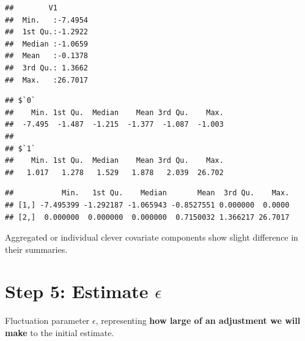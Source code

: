\documentclass[
]{book}
\newenvironment{Shaded}{\begin{snugshade}}{\end{snugshade}}
\newcommand{\DecValTok}[1]{\textcolor[rgb]{0.00,0.00,0.81}{#1}}
\newcommand{\FunctionTok}[1]{\textcolor[rgb]{0.00,0.00,0.00}{#1}}
\newcommand{\NormalTok}[1]{#1}
\newcommand{\SpecialCharTok}[1]{\textcolor[rgb]{0.00,0.00,0.00}{#1}}
\begin{document}
\begin{verbatim}
##        V1         
##  Min.   :-7.4954  
##  1st Qu.:-1.2922  
##  Median :-1.0659  
##  Mean   :-0.1378  
##  3rd Qu.: 1.3662  
##  Max.   :26.7017
\end{verbatim}

\begin{Shaded}
\end{Shaded}

\begin{verbatim}
## $`0`
##    Min. 1st Qu.  Median    Mean 3rd Qu.    Max. 
##  -7.495  -1.487  -1.215  -1.377  -1.087  -1.003 
## 
## $`1`
##    Min. 1st Qu.  Median    Mean 3rd Qu.    Max. 
##   1.017   1.278   1.529   1.878   2.039  26.702
\end{verbatim}

\begin{Shaded}
\end{Shaded}

\begin{verbatim}
##           Min.   1st Qu.    Median       Mean  3rd Qu.    Max.
## [1,] -7.495399 -1.292187 -1.065943 -0.8527551 0.000000  0.0000
## [2,]  0.000000  0.000000  0.000000  0.7150032 1.366217 26.7017
\end{verbatim}

Aggregated or individual clever covariate components show slight difference in their summaries.

\hypertarget{step-5-estimate-epsilon}{%
\section{\texorpdfstring{Step 5: Estimate \(\epsilon\)}{Step 5: Estimate \textbackslash epsilon}}\label{step-5-estimate-epsilon}}

\begin{rmdcomment}
Fluctuation parameter \(\epsilon\), representing \textbf{how large of an
adjustment we will make} to the initial estimate.
\end{rmdcomment}
\end{document}
